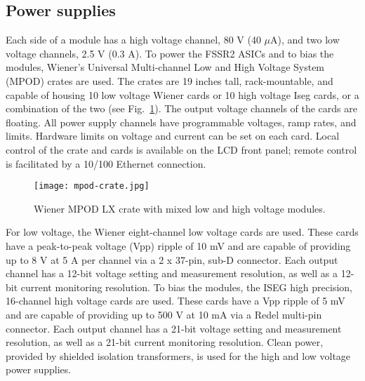 \subsection{Power supplies}

Each side of a module has a high voltage channel, 80 V (40 $\mu$A), and two low voltage channels, 2.5 V (0.3 A). To power the FSSR2 ASICs and to bias the modules, Wiener's Universal Multi-channel Low and High Voltage System (MPOD) crates are used. The crates are 19 inches tall, rack-mountable, and capable of housing 10 low voltage Wiener cards or 10 high voltage Iseg cards, or a combination of the two (see Fig.~\ref{fig:mpod-crate}). The output voltage channels of the cards are floating. All power supply channels have programmable voltages, ramp rates, and limits. Hardware limits on voltage and current can be set on each card. Local control of the crate and cards is available on the LCD front panel; remote control is facilitated by a 10/100 Ethernet connection. 

\begin{figure}[hbt] 
\centering 
\texttt{[image: mpod-crate.jpg]}
\caption{Wiener MPOD LX crate with mixed low and high voltage modules.}
\label{fig:mpod-crate}
\end{figure}

For low voltage, the Wiener eight-channel low voltage cards are used. These cards have a peak-to-peak voltage (Vpp) ripple of 10 mV and are capable of providing up to 8 V at 5 A per channel via a 2 x 37-pin, sub-D connector. Each output channel has a 12-bit voltage setting and measurement resolution, as well as a 12-bit current monitoring resolution. To bias the modules, the ISEG high precision, 16-channel high voltage cards are used. These cards have a Vpp ripple of 5 mV and are capable of providing up to 500 V at 10 mA via a Redel multi-pin connector. Each output channel has a 21-bit voltage setting and measurement resolution, as well as a 21-bit current monitoring resolution. Clean power, provided by shielded isolation transformers, is used for the high and low voltage power supplies.

